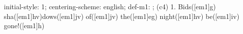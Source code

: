 initial-style: 1;
centering-scheme: english;
def-m1: \grealign;
(c4) 1. Bids([em1]g) sha([em1]hv)dows([em1]jv) of([em1]jv) the([em1]eg) night([em1]hv) be([em1]iv) gone!([em1]h)